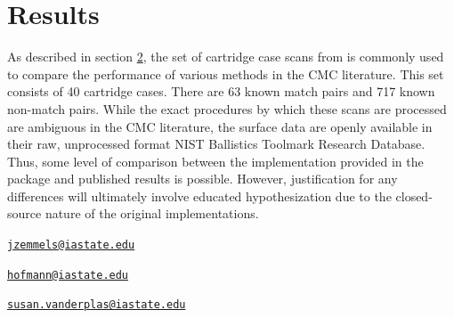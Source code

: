 \hypertarget{results}{%
\section{Results}\label{results}}

As described in section \protect\hyperlink{data}{2}, the set of
cartridge case scans from \citet{fadul_empirical_nodate} is commonly
used to compare the performance of various methods in the CMC
literature. This set consists of 40 cartridge cases. There are 63 known
match pairs and 717 known non-match pairs. While the exact procedures by
which these scans are processed are ambiguous in the CMC literature, the
surface data are openly available in their raw, unprocessed format NIST
Ballistics Toolmark Research Database. Thus, some level of comparison
between the implementation provided in the  package and
published results is possible. However, justification for any
differences will ultimately involve educated hypothesization due to the
closed-source nature of the original implementations.




\address{%
Joseph Zemmels\\
Iowa State University Department of Statistics\\
2438 Osborn Dr\\ Ames, IA 50011\\
}
\href{mailto:jzemmels@iastate.edu}{\nolinkurl{jzemmels@iastate.edu}}

\address{%
Heike Hofmann\\
Iowa State University Department of Statistics\\
2438 Osborn Dr\\ Ames, IA 50011\\
}
\href{mailto:hofmann@iastate.edu}{\nolinkurl{hofmann@iastate.edu}}

\address{%
Susan VanderPlas\\
University of Nebraska - Lincoln Department of Statistics\\
340 Hardin Hall North Wing\\ Lincoln, NE 68583\\
}
\href{mailto:susan.vanderplas@iastate.edu}{\nolinkurl{susan.vanderplas@iastate.edu}}

